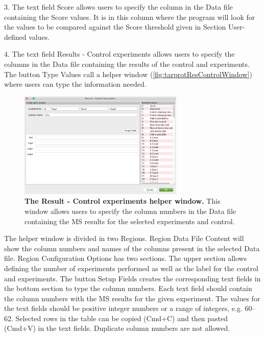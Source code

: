 \num{3}. The text field Score allows users to specify the column in the Data file
containing the Score values. It is in this column where the program will look for
the values to be compared against the Score threshold given in Section User-defined
values.

\num{4}. \label{par:limprotResultControl}The text field Results - Control experiments
allows users to specify the columns in the Data file containing the results of the
control and experiments. The button Type Values call a helper window
(\autoref{fig:tarprotResControlWindow}) where users can type the information needed. 

\begin{figure}[h]
    \centering
    \includegraphics[width=0.7\textwidth]{./IMAGES/MOD-TARPROT/tarprot-rescontrol.jpg}
    \caption[The Result - Control experiments helper window]{\textbf{The Result -
    Control experiments helper window.} This window allows users to specify the column
    numbers in the Data file containing the MS results for the selected experiments
    and control.} 
    \label{fig:tarprotResControlWindow}
    \vspace{-5pt} 	
\end{figure}

The helper window is divided in two Regions. Region Data File Content will show the 
column numbers and names of the columns present in the selected Data file. Region
Configuration Options has two sections. The upper section allows defining the number
of experiments performed as well as the label for the control and experiments. The
button Setup Fields creates the corresponding text fields in the bottom section to
type the column numbers. Each text field should contain the column numbers with the
MS results for the given experiment. The values for the text fields should be positive
integer numbers or a range of integers, e.g. \numrange[range-phrase=--]{60}{62}.
Selected rows in the table can be copied (Cmd+C) and then pasted (Cmd+V) in the text
fields. Duplicate column numbers are not allowed.

